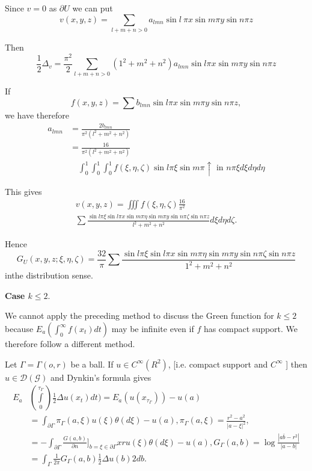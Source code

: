 Since $v = 0$ as $\partial U$ we can put
$$
v(x, y,z) = \sum_{l + m + n > 0} a_{lmn} \sin l\ \pi x \sin m \pi y \sin n \pi z
$$

Then 
$$
\frac{1}{2} \Delta_{v} = \frac{\pi^2}{2}  \sum_{l + m + n > 0}(1^2 +
m^2 + n^2) a_{lmn} \sin l \pi x \sin m \pi y \sin n \pi z 
$$

If
$$
f(x, y, z) = \sum b_{lmn} \sin l \pi x \sin m \pi y \sin n \pi z,
$$
we have therefore
\begin{align*}
  a_{lmn}  &= \frac{2b_{lmn}}{\pi^2 (l^2 + m^2 + n^2)} \\
  &= \frac{16}{\pi^2 (l^2 + m^2 + n^2)}\\
&\quad  \int^1_0 \int^1_0 \int^1_0 f
  (\xi, \eta, \zeta) \sin l \pi \xi \sin m \pi \uparrow \text{ \ in
    \ } 
n \pi \xi d\xi d\eta d\eta 
\end{align*}


This gives
\begin{multline*}
  v(x, y, z) = \iiint f (\xi , \eta, \zeta) \frac{16}{\pi^2}\\ 
  \sum \frac{\sin
    l \pi \xi \sin l \pi x \sin m \pi \eta \sin m \pi y \sin n \pi \zeta \sin
    n \pi z}{l^2 + m^2 + n^2} d\xi d \eta d \zeta. 
\end{multline*}

Hence 
{\fontsize{10pt}{12pt}\selectfont
$$
G_U (x, y, z; \xi , \eta, \zeta) = \frac{32}{\pi} \sum \frac{\sin l \pi \xi
  \sin l \pi x \sin m \pi \eta \sin m \pi y \sin n \pi \zeta \sin n \pi
  z} {1^2 + m^2 + n^2} 
$$}\relax
in\pageoriginale the distribution sense.


\medskip
\noindent
\textbf{Case {\boldmath$k \le 2$}}.
\smallskip

We cannot apply the preceding method to discuss the Green function for
$k \le 2$ because $E_a (\int^\infty_0 f (x_t) dt)$ may be infinite
even if $f$ has compact support. We therefore follow a different
method. 

Let $\Gamma = \Gamma (o, r)$ be a ball. If $u \in C^{\infty} (R^2)$,
[i.e. compact support and $C^\infty$ ] then $u \in \mathscr{D}
(\mathscr{G})$ and Dynkin's formula gives  
\begin{align*}
E_a & \left(\int\limits^{\tau_\Gamma}_0\right) \frac{1}{2} \Delta u (x_t)dt) = E_a
  (u(x_{\tau_\Gamma}))- u (a)\\ 
  & = \int_{\partial \Gamma} \pi_\Gamma (a, \xi ) u (\xi) \theta (d
  \xi) - u (a) , \pi_{\Gamma}(a, \xi )= \frac{r^2 - a^2}{| a - \xi
    |^2}, \\ 
  & = - \int_{\partial \Gamma} \frac{G (a,b)} {\partial n} \bigg ]_{b
    = \xi \in \partial \Gamma} x r u (\xi) \theta (d \xi) - u (a), G_\Gamma
  (a,b)= \log \frac{|a \bar{b} - r^2|} {|a - b|} \\ 
  & = \int_{\Gamma} \frac{1}{2 \pi} G_{\Gamma} (a, b) \frac{1}{2}
  \Delta u(b) 2 db. 
\end{align*}

